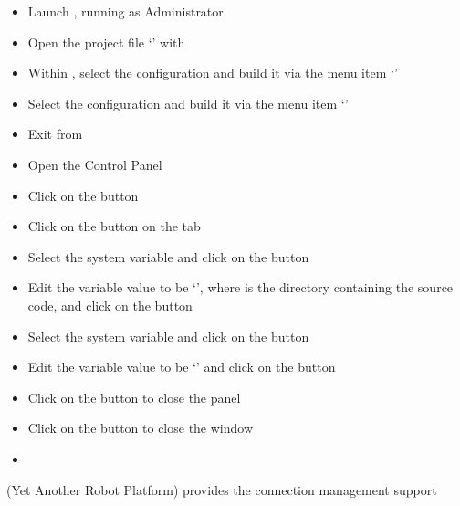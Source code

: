 \begin{itemize}
\item Launch , running as Administrator
\item\exSp{} Open the project file
`' with
\item\exSp{} Within , select the  configuration and
build it via the menu item `'
\item\exSp{} Select the  configuration and build it via the menu item
`'
\item\exSp{} Exit from 
\item\exSp{} Open the  Control Panel
\item\exSp{} Click on the  button
\item\exSp{} Click on the  button on the 
tab
\item\exSp{} Select the  system variable and click on the
 button 
\item\exSp{} Edit the variable value to be
`', where 
is the directory containing the \mplusm{} source code, and click on the  button
\item\exSp{} Select the  system variable and click on
the  button 
\item\exSp{} Edit the variable value to be
`' and click on the
 button
\item\exSp{} Click on the  button to close the 
panel
\item\exSp{} Click on the  button to close the 
window
\end{itemize}
\tertiaryEnd{}
\begin{itemize}
\item\TBD{}
\end{itemize}
\tertiaryEnd{}
\secondaryEnd{}
\textbf{\yarp} (Yet Another Robot Platform) provides the connection management support
